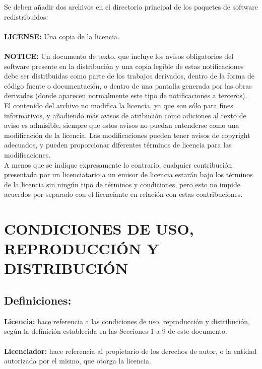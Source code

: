 Se deben añadir dos archivos en el directorio principal de los paquetes de software redistribuidos:\\\\
\textbf{LICENSE:}
Una copia de la licencia.\\\\
\textbf{NOTICE:}
Un documento de texto, que incluye los avisos obligatorios del software presente en la distribución y una copia legible de estas notificaciones debe ser distribuidas como parte de los trabajos derivados, dentro de la forma de código fuente o documentación, o dentro de una pantalla generada por las obras derivadas (donde aparecen normalmente este tipo de notificaciones a terceros).\\

El contenido del archivo no modifica la licencia, ya que son sólo para fines informativos, y añadiendo más avisos de atribución como adiciones al texto de aviso es admisible, siempre que estos avisos no puedan entenderse como una modificación de la licencia. Las modificaciones pueden tener avisos de copyright adecuados, y pueden proporcionar diferentes términos de licencia para las modificaciones.\\

A menos que se indique expresamente lo contrario, cualquier contribución presentada por un licenciatario a un emisor de licencia estarán bajo los términos de la licencia sin ningún tipo de términos y condiciones, pero esto no impide acuerdos por separado con el licenciante en relación con estas contribuciones.\\

\newpage
\chapter{CONDICIONES DE USO, REPRODUCCIÓN Y DISTRIBUCIÓN}
\section{Definiciones:}
\textbf{Licencia:} hace referencia a las condiciones de uso, reproducción y distribución, según la definición establecida en las Secciones 1 a 9 de este documento.\\\\
\textbf{Licenciador:} hace referencia al propietario de los derechos de autor, o la entidad autorizada por el mismo, que otorga la licencia.\\\\

